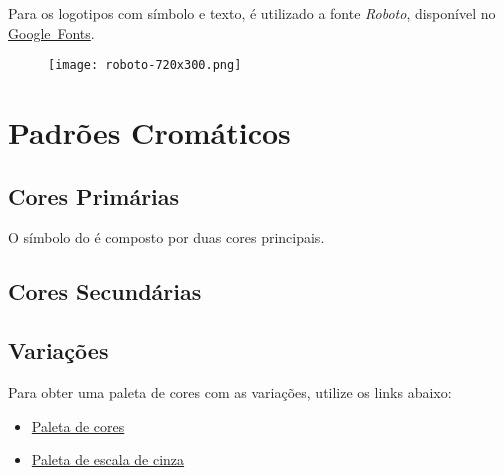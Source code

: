 \documentclass{manualmarca}
\begin{document}
\noindent Para os logotipos com símbolo e texto, é utilizado a fonte \emph{Roboto}, disponível no \href{https://fonts.google.com/specimen/Roboto}{Google~Fonts}.

\vspace*{1cm}
\begin{figure}[!htp]
  \centering
  \texttt{[image: roboto-720x300.png]}
\end{figure}


\pagebreak[4]

\section{Padrões Cromáticos}
\label{sec:padroes-cromaticos}

\subsection{Cores Primárias}
\label{sec:cores-primarias}

O símbolo do \NExT{} é composto por duas cores principais.

\vspace*{1cm}
\noindent
\begin{center}
\end{center}

\subsection{Cores Secundárias}
\label{sec:cores-secundarias}

\vspace*{1cm}
\noindent
{}

\subsection{Variações}
\label{sec:variacoes}

Para obter uma paleta de cores com as variações, utilize os links abaixo:

\begin{itemize}
\item \href{http://paletton.com/#uid=7040D0kvjvXojH8rfABuGpcuRk9}{Paleta de cores}
\item \href{http://paletton.com/#uid=1000D0k004M0dcY0dcY5o003H00}{Paleta de escala de cinza}
\end{itemize}
\end{document}
